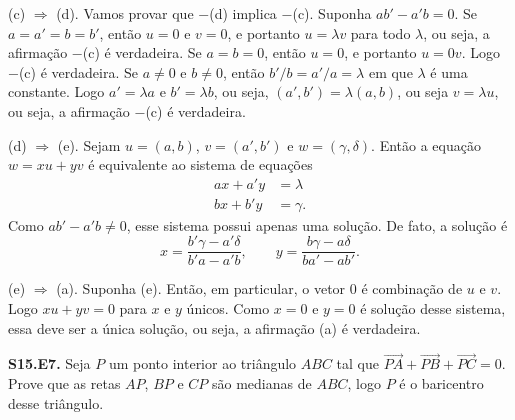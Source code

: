 \documentclass[a4paper,11pt]{article}
\begin{document}
(c) $\Rightarrow$ (d).
Vamos provar que $-$(d) implica $-$(c).
Suponha $a b' - a' b = 0$.
Se $a = a' = b = b'$, então $u = 0$ e $v = 0$, e portanto $u = \lambda v$ para todo $\lambda$, ou seja, a afirmação $-$(c) é verdadeira.
Se $a = b = 0$, então $u = 0$, e portanto $u = 0v$.
Logo $-$(c) é verdadeira.
Se $a \neq 0$ e $b \neq 0$, então $b'/b = a'/a = \lambda$ em que $\lambda$ é uma constante.
Logo $a' = \lambda a$ e $b' = \lambda b$, ou seja, $(a', b') = \lambda (a, b)$, ou seja $v = \lambda u$, ou seja, a afirmação $-$(c) é verdadeira.

(d) $\Rightarrow$ (e).
Sejam $u = (a,b)$, $v = (a',b')$ e $w = (\gamma,\delta)$.
Então a equação $w = xu + yv$ é equivalente ao sistema de equações
\begin{align*}
  a x + a' y & = \lambda \\
  b x + b' y & = \gamma.
\end{align*}
Como $a b' - a' b \neq 0$, esse sistema possui apenas uma solução.
De fato, a solução é
\[
  x = \frac{b' \gamma - a' \delta}{b' a - a' b}, \qquad y = \frac{b \gamma - a \delta}{b a' - a b'}.
\]

(e) $\Rightarrow$ (a).
Suponha (e).
Então, em particular, o vetor $0$ é combinação de $u$ e $v$.
Logo $xu + yv = 0$ para $x$ e $y$ únicos.
Como $x = 0$ e $y = 0$ é solução desse sistema, essa deve ser a única solução, ou seja, a afirmação (a) é verdadeira.

\vspace{\baselineskip}

\textbf{S15.E7.}
Seja $P$ um ponto interior ao triângulo $ABC$ tal que $\overrightarrow{PA} \!+\! \overrightarrow{PB} + \overrightarrow{PC} = 0$.
Prove que as retas $AP$, $BP$ e $CP$ são medianas de $ABC$, logo $P$ é o ba\-ri\-cen\-tro desse triângulo.

\vspace{\baselineskip}
\end{document}
